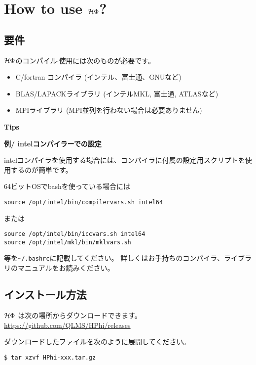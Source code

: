 \chapter{How to use $\mathcal{H} \Phi$?}
\label{Ch:HowTo}

\section{要件}

$\mathcal{H} \Phi$のコンパイル$\cdot$使用には次のものが必要です。
\begin{itemize}
\item C/fortran コンパイラ (インテル、富士通、GNUなど)
\item BLAS/LAPACKライブラリ (インテルMKL, 富士通, ATLASなど)
\item MPIライブラリ (MPI並列を行わない場合は必要ありません)
\end{itemize}

\begin{screen}
\Large 
{\bf Tips}
\normalsize

{\bf 例/ intelコンパイラーでの設定}

intelコンパイラを使用する場合には、コンパイラに付属の設定用スクリプトを使用するのが簡単です。

64ビットOSでbashを使っている場合には
\begin{verbatim}
source /opt/intel/bin/compilervars.sh intel64
\end{verbatim}
または
\begin{verbatim}
source /opt/intel/bin/iccvars.sh intel64
source /opt/intel/mkl/bin/mklvars.sh
\end{verbatim}
等を\verb|~/.bashrc|に記載してください。
詳しくはお手持ちのコンパイラ、ライブラリのマニュアルをお読みください。

\end{screen}


\section{インストール方法}

$\mathcal{H} \Phi$ は次の場所からダウンロードできます。\\
\url{https://github.com/QLMS/HPhi/releases}

ダウンロードしたファイルを次のように展開してください。
\begin{verbatim}
$ tar xzvf HPhi-xxx.tar.gz
\end{verbatim}

